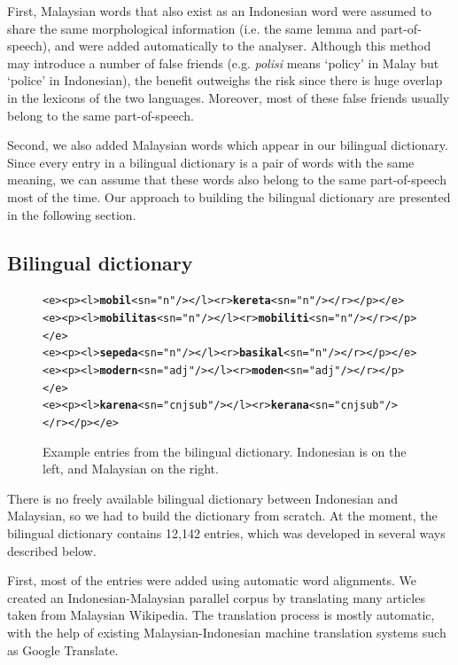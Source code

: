 \documentclass[10pt,a5paper,twoside]{article}
\begin{document}
First, Malaysian words that also exist as an Indonesian word were assumed to share the same morphological information (i.e. the same lemma and part-of-speech), and were added automatically to the analyser. Although this method may introduce a number of false friends (e.g. \emph{polisi} means `policy' in Malay but `police' in Indonesian), the benefit outweighs the risk since there is huge overlap in the lexicons of the two languages. Moreover, most of these false friends usually belong to the same part-of-speech.

Second, we also added Malaysian words which appear in our bilingual dictionary. Since every entry in a bilingual dictionary is a pair of words with the same meaning, we can assume that these words also belong to the same part-of-speech most of the time. Our approach to building the bilingual dictionary are presented in the following section.

\subsection{Bilingual dictionary}

\begin{figure}[htbp]
\begin{center}
\begin{small}
\begin{alltt}
<e><p><l>\textbf{mobil}<s n="n"/></l><r>\textbf{kereta}<s n="n"/></r></p></e>
<e><p><l>\textbf{mobilitas}<s n="n"/></l><r>\textbf{mobiliti}<s n="n"/></r></p></e>
<e><p><l>\textbf{sepeda}<s n="n"/></l><r>\textbf{basikal}<s n="n"/></r></p></e>
<e><p><l>\textbf{modern}<s n="adj"/></l><r>\textbf{moden}<s n="adj"/></r></p></e>
<e><p><l>\textbf{karena}<s n="cnjsub"/></l><r>\textbf{kerana}<s n="cnjsub"/></r></p></e>
\end{alltt}
\end{small}
\caption{Example entries from the bilingual dictionary. Indonesian is on the left, and Malaysian on the right.}
\label{fig:bidix}
\end{center}
\end{figure}

There is no freely available bilingual dictionary between Indonesian and Malaysian, so we had to build the dictionary from scratch. At the moment, the bilingual dictionary contains 12,142 entries, which was developed in several ways described below.

First, most of the entries were added using automatic word alignments. We created an Indonesian-Malaysian parallel corpus by translating many articles taken from Malaysian Wikipedia. The translation process is mostly automatic, with the help of existing Malaysian-Indonesian machine translation systems such as Google Translate.
\end{document}
